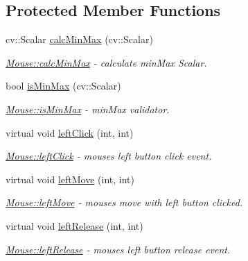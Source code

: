\subsection*{Protected Member Functions}
\begin{DoxyCompactItemize}
\item 
cv\+::\+Scalar \mbox{\hyperlink{class_mouse_ad1e0ab2dbcf1172d7969b50b8a770060}{calc\+Min\+Max}} (cv\+::\+Scalar)
\begin{DoxyCompactList}\small\item\em \mbox{\hyperlink{class_mouse_ad1e0ab2dbcf1172d7969b50b8a770060}{Mouse\+::calc\+Min\+Max}} -\/ calculate min\+Max Scalar. \end{DoxyCompactList}\item 
bool \mbox{\hyperlink{class_mouse_a0f6dd164ad2b506a001d23d4f67dbcec}{is\+Min\+Max}} (cv\+::\+Scalar)
\begin{DoxyCompactList}\small\item\em \mbox{\hyperlink{class_mouse_a0f6dd164ad2b506a001d23d4f67dbcec}{Mouse\+::is\+Min\+Max}} -\/ min\+Max validator. \end{DoxyCompactList}\item 
virtual void \mbox{\hyperlink{class_mouse_a186e5b7ddfbb4681326286509a064d28}{left\+Click}} (int, int)
\begin{DoxyCompactList}\small\item\em \mbox{\hyperlink{class_mouse_a186e5b7ddfbb4681326286509a064d28}{Mouse\+::left\+Click}} -\/ mouse\textquotesingle{}s left button click event. \end{DoxyCompactList}\item 
virtual void \mbox{\hyperlink{class_mouse_a809fe39af5186e39a5768fb6bb06da56}{left\+Move}} (int, int)
\begin{DoxyCompactList}\small\item\em \mbox{\hyperlink{class_mouse_a809fe39af5186e39a5768fb6bb06da56}{Mouse\+::left\+Move}} -\/ mouse\textquotesingle{}s move with left button clicked. \end{DoxyCompactList}\item 
virtual void \mbox{\hyperlink{class_mouse_a837d20f61ecb374f5b9c789cc141983e}{left\+Release}} (int, int)
\begin{DoxyCompactList}\small\item\em \mbox{\hyperlink{class_mouse_a837d20f61ecb374f5b9c789cc141983e}{Mouse\+::left\+Release}} -\/ mouse\textquotesingle{}s left button release event. \end{DoxyCompactList}\end{DoxyCompactItemize}

